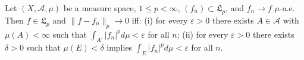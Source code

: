 Let $(X, \mathcal{A}, \mu)$ be a measure space, $1 \leq p < \infty$, $(f_n) \subset \mathfrak{L}_p$, and $f_n \to f$ $\mu$-a.e. Then $f \in \mathfrak{L}_p$ and $\|f - f_n\|_p \to 0$ iff: (i) for every $\varepsilon > 0$ there exists $A \in \mathcal{A}$ with $\mu(A) < \infty$ such that $\int_{A'} |f_n|^p d\mu < \varepsilon$ for all $n$; (ii) for every $\varepsilon > 0$ there exists $\delta > 0$ such that $\mu(E) < \delta$ implies $\int_E |f_n|^p d\mu < \varepsilon$ for all $n$.
